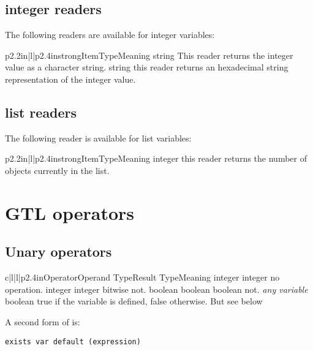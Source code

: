 \subsection{integer readers}

The following readers are available for integer variables:

\begin{longtableiii}{p{2.2in}|l|p{2.4in}}{strong}{Item}{Type}{Meaning}
  {string}
  {This reader returns the integer value as a character string.}
  {string}
  {this reader returns an hexadecimal string representation of the integer value.}
\end{longtableiii}

\subsection{list readers}

The following reader is available for list variables:

\begin{longtableiii}{p{2.2in}|l|p{2.4in}}{strong}{Item}{Type}{Meaning}
  {integer}
  {this reader returns the number of objects currently in the list.}
\end{longtableiii}

\section{GTL operators}

\subsection{Unary operators}

\begin{longtableiv}{c|l|l|p{2.4in}}{}{Operator}{Operand Type}{Result Type}{Meaning}
  \lineiv{+}
  {integer}
  {integer}
  {no operation.}
  \lineiv{$\sim$}
  {integer}
  {integer}
  {bitwise not.}
  {boolean}
  {boolean}
  {boolean not.}
  {{\em any variable}}
  {boolean}
  {true if the variable is defined, false otherwise. But see below}
\end{longtableiv}

A second form of  is:
 
\begin{lstlisting}[frame=single]
exists var default (expression)
\end{lstlisting}

